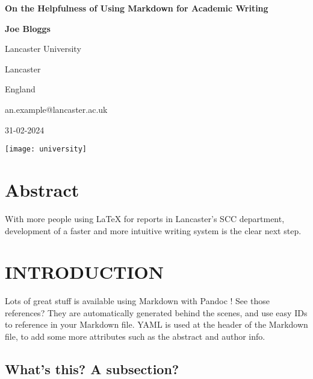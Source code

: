 \documentclass{article}
\begin{document}
\begin{titlepage}
\begin{center}
\vspace*{1cm}

\Huge
\textbf{On the Helpfulness of Using Markdown for Academic Writing}

\vspace{0.8cm}

\Large
\centerline{\textbf{Joe Bloggs}}
\large
\centerline{Lancaster University}
\large
\centerline{Lancaster}
\large
\centerline{England}
\small
\centerline{an.example@lancaster.ac.uk}
\centerline{31-02-2024}

\vspace{0.8cm}

\texttt{[image: university]}

\end{center}
\end{titlepage}



\section*{Abstract}
\thispagestyle{plain}
\begin{center}
    \large
    \vspace{0.9cm}
    With more people using LaTeX for reports in Lancaster's SCC
    department, development of a faster and more intuitive writing
    system is the clear next step.
\end{center}
\newpage
\tableofcontents

\section{INTRODUCTION}

Lots of great stuff is available using Markdown \citep{markdown} with
Pandoc \citep{pandoc}! See those references? They are automatically
generated behind the scenes, and use easy IDs to reference in your
Markdown file. YAML is used at the header of the Markdown file, to add
some more attributes such as the abstract and author info.

\subsection{What's this? A subsection?}
\end{document}
